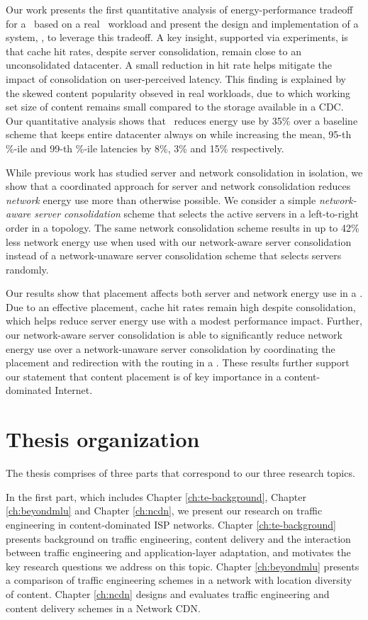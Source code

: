 Our work presents the first quantitative analysis of energy-performance tradeoff for a \cdc\ based on a real \cdc\ workload and present the design and implementation of a system, \shrink, to leverage this tradeoff. A key insight, supported via experiments, is that cache hit rates, despite server consolidation, remain close to an unconsolidated datacenter. A small reduction in hit rate helps mitigate the impact of consolidation on user-perceived latency. This finding is explained by the skewed content popularity obseved in real workloads, due to which working set size of content remains small compared to the storage available in a CDC. Our quantitative analysis shows that \shrink\ reduces energy use by 35\% over a baseline scheme that keeps entire datacenter always on while increasing the mean, 95-th \%-ile and 99-th \%-ile latencies by 8\%, 3\% and 15\% respectively. 

While previous work has studied server and network consolidation in isolation, we show that a coordinated approach for server and network consolidation reduces \emph{network} energy use more than otherwise possible. We consider a simple \emph{network-aware server consolidation} scheme that selects the active servers in a left-to-right order in a topology. The same network consolidation scheme results in up to 42\% less network energy use when used with our network-aware server consolidation instead of a network-unaware server consolidation scheme that selects servers randomly. 

Our results show that placement affects both server and network energy use in a \cdc. Due to an effective placement, cache hit rates remain high despite consolidation, which helps reduce server energy use with a modest performance impact. Further, our network-aware server consolidation is able to significantly reduce network energy use over a network-unaware server consolidation by coordinating the placement and redirection with the routing in a \cdc. These results further support our statement that content placement is of key importance in a content-dominated Internet.


\section{Thesis organization}

The thesis comprises of three parts that correspond to our three research topics.

In the first part, which includes Chapter \ref{ch:te-background}, Chapter \ref{ch:beyondmlu} and Chapter \ref{ch:ncdn}, we present our research on traffic engineering in content-dominated ISP networks. Chapter \ref{ch:te-background} presents background on traffic engineering, content delivery and the interaction between traffic engineering and application-layer adaptation, and motivates the key research questions we address on this topic. Chapter \ref{ch:beyondmlu} presents a comparison of traffic engineering schemes in a network with location diversity of content. Chapter \ref{ch:ncdn} designs and evaluates traffic engineering and content delivery schemes in a Network CDN.

